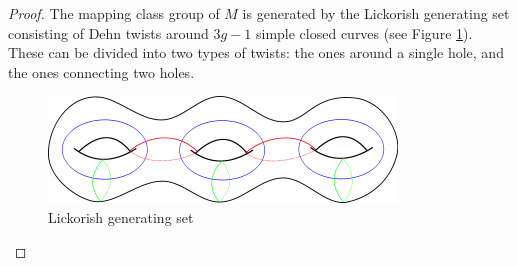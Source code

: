 \documentclass{amsart}
\begin{document}
\begin{proof}
The mapping class group of $M$ is generated by the Lickorish generating set consisting of Dehn twists around $3g-1$ simple closed curves (see Figure \ref{fig:lickorish}).  These can be divided into two types of twists: the ones around a single hole, and the ones connecting two holes.

\begin{figure}
\includegraphics[width=.80\textwidth]{lickorish.png}
\caption{Lickorish generating set}
\label{fig:lickorish}
\end{figure}

\newcommand{\nc}{\newcommand}


     \nc{\lcx}{-0.5}
     \nc{\lcy}{0.866}
     \nc{\rcx}{-\lcx}
     \nc{\rcy}{\lcy}
     \nc{\makeBdy}{\path[draw] (-1,0) -- (\lcx, \lcy) -- (\rcx, \rcy) -- (1, 0);}

    \nc{\lcutx}{-0.6}
    \nc{\lcuty}{0.6928}
    \nc{\lcut}{(\lcutx, \lcuty)}
    \nc{\rcutx}{-\lcutx}
    \nc{\rcuty}{\lcuty}
    \nc{\rcut}{(\rcutx, \rcuty)}

    \nc{\mvx}{0}
    \nc{\mvy}{0.2}
    \nc{\mv}{(\mvx, \mvy)}

    \nc{\outEdge}{\draw[postaction={decorate}]  (0, 0) -- \mv node[pos=.5, right]{$hgh^{-1}$};}

    \nc{\mtopx}{0}
    \nc{\mtopy}{0.866}
    \nc{\mtop}{(\mtopx, \mtopy)}


\begin{figure}
    \centering
\end{figure}
\end{proof}
\end{document}
